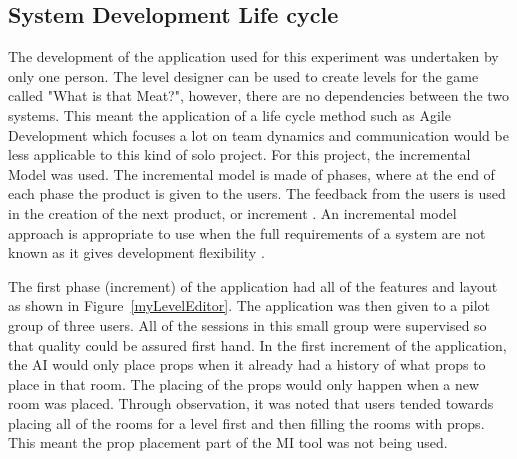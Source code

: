 \documentclass[journal]{IEEEtran}
\begin{document}
\subsection{System Development Life cycle}
The development of the application used for this experiment was undertaken by only one person. The level designer can be used to create levels for the game called "What is that Meat?", however, there are no dependencies between the two systems. This meant the application of a life cycle method such as Agile Development which focuses a lot on team dynamics and communication\cite{agile} would be less applicable to this kind of solo project. For this project, the incremental Model was used. The incremental model is made of phases, where at the end of each phase the product is given to the users. The feedback from the users is used in the creation of the next product, or increment \cite{massey2012comparing}. An incremental model approach is appropriate to use when the full requirements of a system are not known as it gives development flexibility \cite{isaias2015information}. 

The first phase (increment) of the application had all of the features and layout as shown in Figure~\ref{myLevelEditor}. The application was then given to a pilot group of three users. All of the sessions in this small group were supervised so that quality could be assured first hand. In the first increment of the application, the AI would only place props when it already had a history of what props to place in that room. The placing of the props would only happen when a new room was placed. Through observation, it was noted that users tended towards placing all of the rooms for a level first and then filling the rooms with props. This meant the prop placement part of the MI tool was not being used. 
\end{document}
